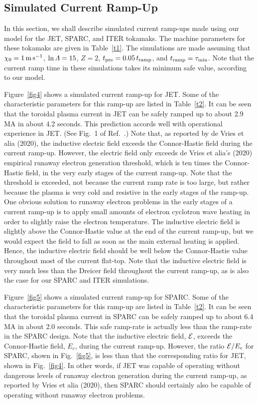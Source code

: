 \documentclass[12pt,prb,aps]{revtex4-1}
\begin{document}
\subsection{Simulated Current Ramp-Up}
In this section, we shall describe simulated current ramp-ups made using our model for the JET, SPARC, and ITER tokamaks. The
machine parameters for these tokamaks are given in Table~\ref{t1}. The simulations are made assuming that $\chi_0=1\,{\rm m\,s}^{-1}$,
$\ln{\mit\Lambda} = 15$, $Z=2$, $t_{\rm pre}= 0.05\,t_{\rm ramp}$, and $t_{\rm ramp} =\tau_{\rm min}$. Note that the current ramp time in these simulations takes its
minimum safe value, according to our model. 

Figure~\ref{fig4} shows a simulated current ramp-up for JET. Some of the characteristic  parameters for this ramp-up are listed in Table~\ref{t2}. 
It can be seen that the toroidal plasma current in JET can be safely ramped up to about 2.9 MA in about 4.2 seconds. This prediction accords well
with operational experience in JET. (See Fig.~1 of Ref.~.)
Note that, as reported by de Vries et alia (2020),\cite{run} the inductive electric field exceeds the Connor-Hastie field during the current ramp-up. However,
the electric field only exceeds de Vries et alia's (2020) empirical runaway electron generation threshold, which is ten times the Connor-Hastie field,\cite{run} in
the very early stages of the current ramp-up. Note that the threshold is exceeded, not because the current ramp  rate is too large, but rather because the
plasma is very cold and resistive in the early stages of the ramp-up. One obvious solution to runaway electron problems in the early
stages of a current ramp-up is to apply small amounts of electron cyclotron wave heating in order to slightly raise the electron temperature. 
The inductive electric field is slightly above the Connor-Hastie value at the end of the current ramp-up, but we would expect the field to
fall as soon as the main external heating is applied. Hence, the inductive electric field should be well below the Connor-Hastie
value throughout most of the current flat-top. Note that the inductive electric field is very much less than the Dreicer field throughout the current ramp-up, as is also
the case for our SPARC and ITER simulations. 

Figure~\ref{fig5} shows a simulated current ramp-up for SPARC. Some of the characteristic  parameters for this ramp-up are listed in Table~\ref{t2}. 
It can be seen that the toroidal plasma current in SPARC can be safely ramped up to about 6.4 MA in about 2.0 seconds. This safe ramp-rate is 
actually less than the ramp-rate in the SPARC design.\cite{creely} 
Note that the inductive electric field, ${\cal E}$,  exceeds the Connor-Hastie field, $E_c$,  during the current ramp-up. However, the ratio ${\cal E}/E_c$ for SPARC,
shown  in Fig.~\ref{fig5}, is less than that the corresponding ratio for JET,  shown in Fig.~\ref{fig4}. In other words, if JET was capable of
operating without dangerous levels of runaway electron generation during the current ramp-up, as reported by  Vries et alia (2020),\cite{run} then SPARC
should certainly also be capable of operating without runaway electron problems. 
\end{document}
